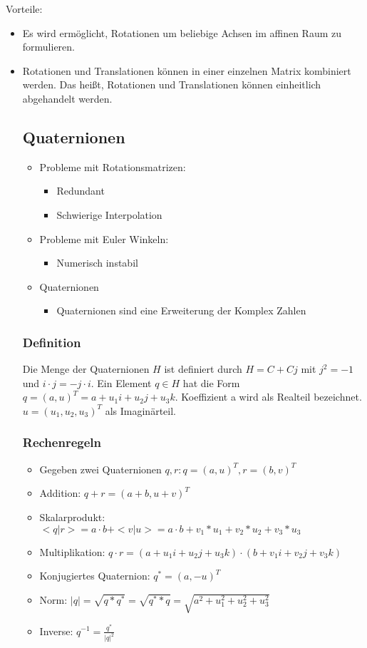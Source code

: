 \documentclass[paper=a4, fontsize=11pt]{scrartcl} %
\numberwithin{equation}{section} %
\numberwithin{figure}{section} %
\numberwithin{table}{section} %
\begin{document}
Vorteile:
\begin{itemize}
\item Es wird ermöglicht, Rotationen um beliebige Achsen im affinen Raum zu formulieren.
\item Rotationen und Translationen können in einer einzelnen Matrix kombiniert werden. Das heißt, Rotationen und Translationen können einheitlich abgehandelt werden.

\subsection{Quaternionen}

\begin{itemize}
\item Probleme mit Rotationsmatrizen:
\begin{itemize}
\item Redundant
\item Schwierige Interpolation
\end{itemize}
\item Probleme mit Euler Winkeln:
\begin{itemize}
\item Numerisch instabil
\end{itemize}
\item Quaternionen
\begin{itemize}
\item Quaternionen sind eine Erweiterung der Komplex Zahlen
\end{itemize}
\end{itemize}

\subsubsection{Definition}

Die Menge der Quaternionen $H$ ist definiert durch $H = C + Cj$ mit $j^2 = -1$ und $i \cdot j = -j \cdot i$. Ein Element $q \in H$ hat die Form $q = (a,u)^T = a + u_1 i + u_2 j + u_3 k$. Koeffizient a wird als Realteil bezeichnet. $u = (u_1,u_2,u_3)^T$ als Imaginärteil.

\subsubsection{Rechenregeln}

\begin{itemize}
\item Gegeben zwei Quaternionen $q,r: q = (a,u)^T, r = (b,v)^T$
\item Addition: $q+r = (a+b,u+v)^T$
\item Skalarprodukt: $<q|r> = a \cdot b + <v|u> = a \cdot b + v_1 * u_1 + v_2 * u_2 + v_3 * u_3$
\item Multiplikation: $q \cdot r = (a + u_1 i + u_2 j + u_3 k) \cdot (b + v_1 i + v_2 j + v_3 k)$
\item Konjugiertes Quaternion: $q^* = (a,-u)^T$
\item Norm: $|q| = \sqrt{q * q^*} = \sqrt{q^* * q} = \sqrt{a^2 + u_1^2 + u_2^2 + u_3^2}$
\item Inverse: $q^{-1} = \frac{q^*}{|q|^2}$
\end{itemize} 


\end{itemize}
\end{document}

